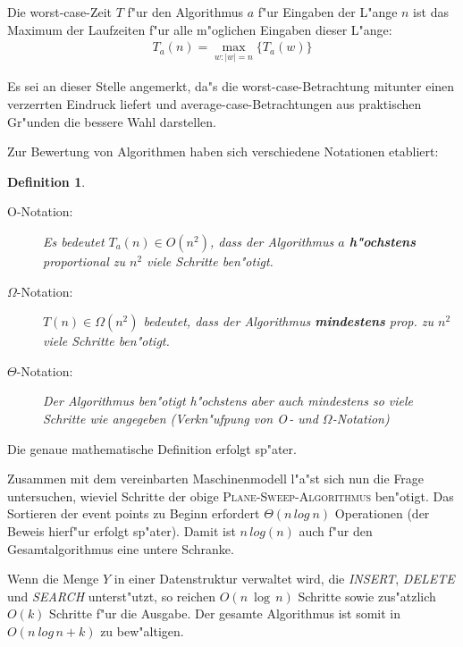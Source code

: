 \documentclass[draft,12pt]{scrreprt}
\theoremstyle{break}
\newtheorem{definition}{Definition}
\begin{document}
Die worst-case-Zeit $T$ f"ur den Algorithmus $a$ f"ur Eingaben der L"ange $n$
ist das Maximum der Laufzeiten f"ur alle m"oglichen Eingaben dieser
L"ange:
\begin{gather*}
  T_a(n) = \max_{w:|w|=n}\big\{T_a(w)\big\}
\end{gather*}

Es sei an dieser Stelle angemerkt, da"s die worst-case-Betrachtung mitunter
einen verzerrten Eindruck liefert und average-case-Betrachtungen aus
praktischen Gr"unden die bessere Wahl darstellen.

Zur Bewertung von Algorithmen haben sich verschiedene Notationen
etabliert:
\begin{definition}
  \begin{description}
   \item[O-Notation:]
    Es bedeutet $T_a(n) \in O(n^2)$, dass der Algorithmus $a$
    \textbf{h"ochstens} proportional zu $n^2$ viele Schritte ben"otigt. 
   \item[$\Omega$-Notation:]
    $T(n) \in \Omega (n^2)$ bedeutet, dass der Algorithmus \textbf{mindestens}
    prop. zu $n^2$ viele Schritte ben"otigt. 
   \item[$\Theta$-Notation:]
    Der Algorithmus ben"otigt h"ochstens aber auch mindestens so viele
    Schritte wie angegeben (Verkn"ufpung von O$\,$- und $\Omega$-Notation)
  \end{description}
\end{definition}
Die genaue mathematische Definition erfolgt sp"ater.

Zusammen mit dem vereinbarten
Maschinenmodell l"a"st sich nun die Frage untersuchen, wieviel Schritte
der obige \textsc{Plane-Sweep-Algorithmus} ben"otigt.
Das Sortieren der event points zu Beginn erfordert $\Theta(n\, log~n)$
Operationen (der Beweis hierf"ur erfolgt sp"ater). Damit ist $n\,log(n)$
auch f"ur den Gesamtalgorithmus eine untere Schranke.

Wenn die Menge $Y$ in einer Datenstruktur verwaltet wird, die 
\textit{INSERT}, \textit{DELETE} und \textit{SEARCH} unterst"utzt, so
reichen $O(n\: \log\,n)$ Schritte sowie zus"atzlich $O(k)$ Schritte f"ur
die Ausgabe. Der gesamte Algorithmus ist somit in $O(n\:log\,n+k)$ zu
bew"altigen.

\end{document}
